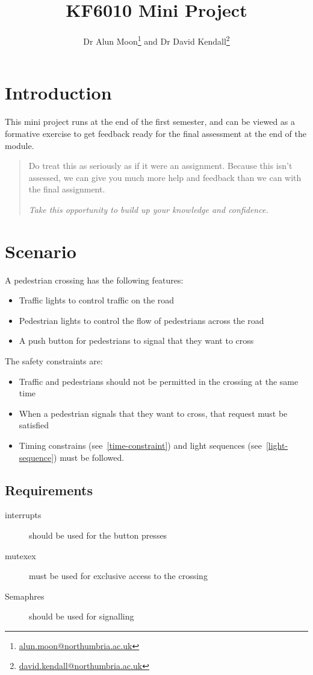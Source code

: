 \documentclass{article}
\title{KF6010 Mini Project}
\author{Dr Alun Moon\thanks{\url{alun.moon@northumbria.ac.uk}} and
Dr David Kendall\thanks{\url{david.kendall@northumbria.ac.uk}}}
\begin{document}
\maketitle

\begin{abstract}
\end{abstract}

\section{Introduction}
	This mini project runs at the end of the first semester, and can be viewed
	as a formative exercise to get feedback ready for the final assessment at
	the end of the module.
	\begin{quote}
		Do treat this as seriously as if it were an assignment.
		Because this isn't assessed, we can give you much more help and
		feedback than we can with the final assignment.  

		\emph{Take this opportunity to build up your knowledge and confidence.}
	\end{quote}

\section{Scenario}
A pedestrian crossing has the following features:
\begin{itemize}
	\item Traffic lights to control traffic on the road
	\item Pedestrian lights to control the flow of pedestrians across the road
	\item A push button for pedestrians to signal that they want to cross
\end{itemize}
The safety constraints are:
\begin{itemize}
	\item Traffic and pedestrians should not be permitted in the crossing at
		the same time
	\item When a pedestrian signals that they want to cross, that request must
		be satisfied
	\item Timing constrains (see~\ref{time-constraint}) and light
		sequences (see~\ref{light-sequence}) must be followed.
\end{itemize}

\subsection{Requirements}
\begin{description}
	\item[interrupts] should be used for the button presses
	\item[mutexex] must be used for exclusive access to the crossing
	\item[Semaphres] should be used for signalling
\end{description}
\end{document}
